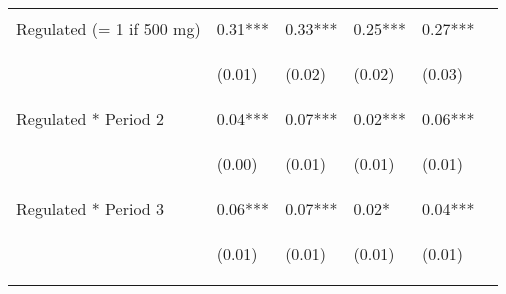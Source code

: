 \documentclass[12pt]{article}
\begin{document}
\begin{center}
\begin{longtable}{p{}p{}p{}p{}p{}p{}}
\vspace{2pt} & \begin{footnotesize}\end{footnotesize} & \begin{footnotesize}\end{footnotesize} & \begin{footnotesize}\end{footnotesize} & \begin{footnotesize}\end{footnotesize} \\
Regulated (= 1 if 500 mg) & 0.31*** & 0.33*** & 0.25*** & 0.27*** \\
\vspace{2pt} & \begin{footnotesize}(0.01)\end{footnotesize} & \begin{footnotesize}(0.02)\end{footnotesize} & \begin{footnotesize}(0.02)\end{footnotesize} & \begin{footnotesize}(0.03)\end{footnotesize} \\
Regulated * Period 2 & 0.04*** & 0.07*** & 0.02*** & 0.06*** \\
\vspace{2pt} & \begin{footnotesize}(0.00)\end{footnotesize} & \begin{footnotesize}(0.01)\end{footnotesize} & \begin{footnotesize}(0.01)\end{footnotesize} & \begin{footnotesize}(0.01)\end{footnotesize} \\
Regulated * Period 3 & 0.06*** & 0.07*** & 0.02* & 0.04*** \\
\vspace{2pt} & \begin{footnotesize}(0.01)\end{footnotesize} & \begin{footnotesize}(0.01)\end{footnotesize} & \begin{footnotesize}(0.01)\end{footnotesize} & \begin{footnotesize}(0.01)\end{footnotesize} \\

\end{longtable}
\end{center}
\end{document}
